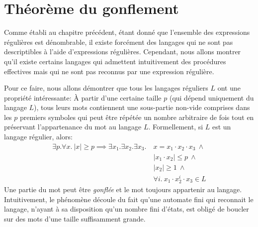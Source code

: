 \section{Théorème du gonflement}

Comme établi au chapitre précédent, étant donné que l'ensemble des expressions régulières est dénombrable, il existe forcément des langages qui ne sont pas descriptibles à l'aide d'expressions régulières.
Cependant, nous allons montrer qu'il existe certains langages qui admettent intuitivement des procédures effectives mais qui ne sont pas reconnus par une expression régulière.

Pour ce faire, nous allons démontrer que tous les langages réguliers $L$ ont une propriété intéressante:
À partir d'une certaine taille $p$ (qui dépend uniquement du langage $L$), tous leurs mots contiennent une sous-partie non-vide comprises dans les $p$ premiers symboles qui peut être répétée un nombre arbitraire de fois tout en préservant l'appartenance du mot au langage $L$. Formellement, si $L$ est un langage régulier, alors:
\begin{align*}
\exists p. \forall x.\ |x| \geq p \implies \exists x_1. \exists x_2. \exists x_3.\ &x = x_1 \cdot x_2 \cdot x_3\ \wedge\\
&|x_1 \cdot x_2| \leq p\ \wedge\\
&|x_2| \geq 1\ \wedge\\
&\forall i.\ x_1 \cdot x_2^i \cdot x_3 \in L
\end{align*}
Une partie du mot peut être \textit{gonflée} et le mot toujours appartenir au langage.
Intuitivement, le phénomène découle du fait qu'une automate fini qui reconnait le langage, n'ayant à sa disposition qu'un nombre fini d'états, est obligé de boucler sur des mots d'une taille suffisamment grande.

